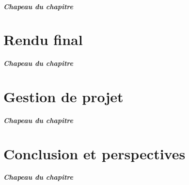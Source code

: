 \documentclass[12pt, french]{report}
\begin{document}
\paragraph{Chapeau du chapitre}

\clearpage

\chapter{Rendu final}
\paragraph{Chapeau du chapitre}

\clearpage

\chapter{Gestion de projet}
\paragraph{Chapeau du chapitre}

\clearpage

\chapter{Conclusion et perspectives}
\paragraph{Chapeau du chapitre}

\clearpage



\clearpage


\clearpage
\end{document}
